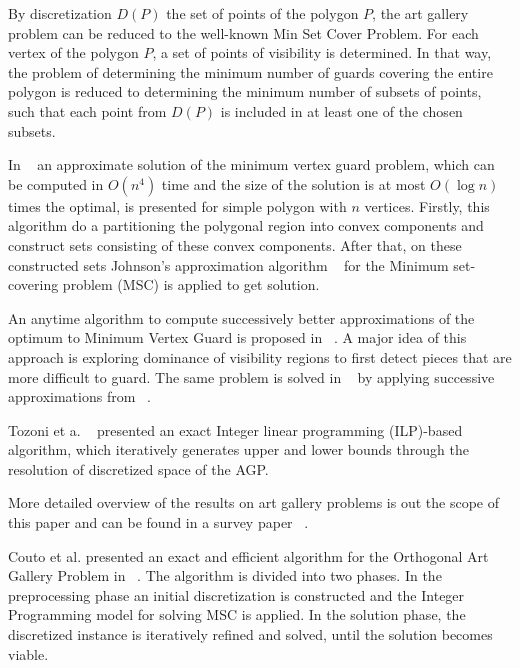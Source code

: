 \documentclass[runningheads,a4paper]{elsarticle}
\begin{document}
     By discretization $D(P)$ the set of points of the polygon $P$, the art gallery problem can be reduced to the well-known Min Set Cover Problem. For each vertex of the polygon $P$, a set of points of visibility is determined. In that way, the problem of determining the minimum number of guards covering the entire polygon is reduced to determining the minimum number of subsets of points, such that each point from $D(P)$ is included in at least one of the chosen subsets.



     In ~\cite{ghosh2010approximation} an approximate solution of the minimum vertex guard problem, which can be computed in $O(n^4)$ time and the size of the solution is at most $O(\log n)$ times the optimal, is presented for simple polygon with $n$ vertices. Firstly, this algorithm do a partitioning the polygonal region into convex components and construct sets consisting of these convex components. After that, on these constructed sets Johnson’s approximation algorithm ~\cite{johnson1974approximation} for the Minimum set-covering problem (MSC) is applied to get solution.

     An anytime algorithm to compute successively better approximations of the optimum to Minimum Vertex Guard is proposed in ~\cite{tomas2003approximation}.  A major idea of this approach is exploring dominance of visibility regions to first detect pieces that are
more difficult to guard. The same problem is solved   in ~\cite{tomas2006visibility} by applying successive approximations from  ~\cite{tomas2003approximation}.

Tozoni et a. ~\cite{tozoni2013practical,tozoni2016algorithm}  presented an exact Integer linear programming  (ILP)-based  algorithm, which iteratively generates upper and lower bounds through the resolution of discretized space of the AGP.

More detailed overview of the results on art gallery problems is out the scope of this paper and can be found in a survey paper  ~\cite{ghosh2010approximation2}.


    Couto et al. presented an exact and efficient algorithm for the Orthogonal Art Gallery Problem in ~\cite{couto2007exact}. The algorithm is divided into two phases. In the preprocessing phase an initial discretization is constructed and the Integer Programming model for solving MSC is applied.  In the solution phase, the discretized instance is iteratively refined and solved, until the solution becomes viable. 
\end{document}
